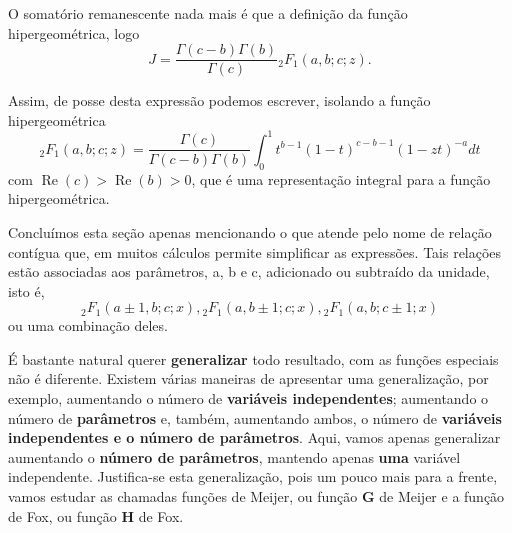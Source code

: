 O somatório remanescente nada mais é que a definição da função hipergeométrica, logo
$$J = \dfrac{\Gamma(c - b)\Gamma(b)}{\Gamma(c)} {}_2F_1(a, b; c; z).$$

Assim, de posse desta expressão podemos escrever, isolando a função hipergeométrica
$${}_2F_1(a, b; c; z) = \dfrac{\Gamma(c)}{\Gamma(c - b) \Gamma(b)} \int_0^1 t^{b-1} (1 - t)^{c-b-1} (1 - zt)^{-a} dt$$
com $\operatorname{Re}(c) > \operatorname{Re}(b) > 0$, que é uma representação integral para a função hipergeométrica.

Concluímos esta seção apenas mencionando o que atende pelo nome de relação contígua que, em muitos cálculos permite simplificar as expressões. Tais relações estão associadas aos parâmetros, a, b e c, adicionado ou subtraído da unidade, isto é,
$${}_2F_1(a \pm 1, b; c; x), {}_2F_1(a, b \pm 1; c; x), {}_2F_1(a, b; c \pm 1; x)$$
ou uma combinação deles.


É bastante natural querer \textbf{generalizar} todo resultado, com as funções especiais não é diferente. Existem várias maneiras de apresentar uma generalização, por exemplo, aumentando o número de \textbf{variáveis independentes}; aumentando o número de \textbf{parâmetros} e, também, aumentando ambos, o número de \textbf{variáveis independentes e o número de parâmetros}. Aqui, vamos apenas generalizar aumentando o \textbf{número de parâmetros}, mantendo apenas \textbf{uma} variável independente. Justifica-se esta generalização, pois um pouco mais para a frente, vamos estudar as chamadas funções de Meijer, ou função $\mathbf{G}$ de Meijer e a função de Fox, ou função $\mathbf{H}$ de Fox.




